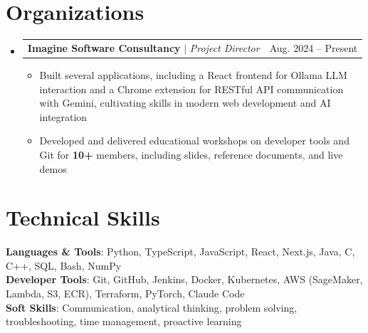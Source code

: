 \documentclass[letterpaper,11pt]{article}
\makeatletter
\newcommand{\resumeItem}[1]{
  \item\small{
    {#1 \vspace{-4pt}}
  }
}
\newcommand{\resumeProjectHeading}[2]{
    \item
    \begin{tabular*}{0.97\textwidth}{l@{\extracolsep{\fill}}r}
      \small#1 & #2 \\
    \end{tabular*}\vspace{-7pt}
}
\newcommand{\resumeSubHeadingListStart}{\begin{itemize}[leftmargin=0.15in, label={}]}
\newcommand{\resumeSubHeadingListEnd}{\end{itemize}}
\newcommand{\resumeItemListStart}{\begin{itemize}}
\newcommand{\resumeItemListEnd}{\end{itemize}\vspace{-5pt}}
\makeatother
\begin{document}
\section{Organizations}
  \resumeSubHeadingListStart

    \resumeProjectHeading
      {\textbf{Imagine Software Consultancy} $|$ \emph{Project Director}}{Aug. 2024 -- Present}
      \resumeItemListStart
        \resumeItem{Built several applications, including a React frontend for Ollama LLM interaction and a Chrome extension for RESTful API communication with Gemini, cultivating skills in modern web development and AI integration}
        \resumeItem{Developed and delivered educational workshops on developer tools and Git for \textbf{10+} members, including slides, reference documents, and live demos}
      \resumeItemListEnd

 \resumeSubHeadingListEnd
 
%
\section{Technical Skills}
 \begin{itemize}[leftmargin=0.15in, label={}]
    \small{\item{
     \textbf{Languages \& Tools}{: Python, TypeScript, JavaScript, React, Next.js, Java, C, C++, SQL, Bash, NumPy} \\
     \textbf{Developer Tools}{: Git, GitHub, Jenkins, Docker, Kubernetes, AWS (SageMaker, Lambda, S3, ECR), Terraform, PyTorch, Claude Code} \\
     \textbf{Soft Skills}{: Communication, analytical thinking, problem solving, troubleshooting, time management, proactive learning} \\
    }}
 \end{itemize}


\end{document}
